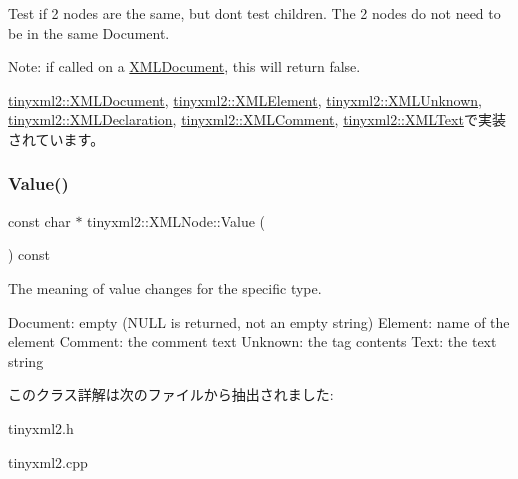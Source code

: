 Test if 2 nodes are the same, but don\textquotesingle{}t test children. The 2 nodes do not need to be in the same Document.

Note\+: if called on a \hyperlink{classtinyxml2_1_1_x_m_l_document}{X\+M\+L\+Document}, this will return false. 

\hyperlink{classtinyxml2_1_1_x_m_l_document_a6fe5ef18699091844fcf64b56ffa5bf9}{tinyxml2\+::\+X\+M\+L\+Document}, \hyperlink{classtinyxml2_1_1_x_m_l_element_a61ffd7bf918a9db4aa6203d855ac5ec2}{tinyxml2\+::\+X\+M\+L\+Element}, \hyperlink{classtinyxml2_1_1_x_m_l_unknown_ac46767cd721d666e690a6231dfb618d1}{tinyxml2\+::\+X\+M\+L\+Unknown}, \hyperlink{classtinyxml2_1_1_x_m_l_declaration_ae8b4d3a399857029f36c322b0801b69c}{tinyxml2\+::\+X\+M\+L\+Declaration}, \hyperlink{classtinyxml2_1_1_x_m_l_comment_a965d880a99d58dd915caa88dc37a9b51}{tinyxml2\+::\+X\+M\+L\+Comment}, \hyperlink{classtinyxml2_1_1_x_m_l_text_a99d8bce4dc01df889126e047f358cdfc}{tinyxml2\+::\+X\+M\+L\+Text}で実装されています。

\mbox{\label{classtinyxml2_1_1_x_m_l_node_a0485e51c670e741884cfd8362274d680}} 
\subsubsection{\texorpdfstring{Value()}{Value()}}
{\footnotesize\ttfamily const char $\ast$ tinyxml2\+::\+X\+M\+L\+Node\+::\+Value (\begin{DoxyParamCaption}{ }\end{DoxyParamCaption}) const}

The meaning of \textquotesingle{}value\textquotesingle{} changes for the specific type. \begin{DoxyVerb}Document:   empty (NULL is returned, not an empty string)
Element:    name of the element
Comment:    the comment text
Unknown:    the tag contents
Text:       the text string
\end{DoxyVerb}
 

このクラス詳解は次のファイルから抽出されました\+:\begin{DoxyCompactItemize}
\item 
tinyxml2.\+h\item 
tinyxml2.\+cpp\end{DoxyCompactItemize}
